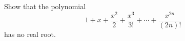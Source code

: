 Show that the polynomial
\[
1 + x + \frac{x^2}{2} + \frac{x^3}{3!} + \cdots + \frac{x^{2n}}{(2n)!}
\]
has no real root.
